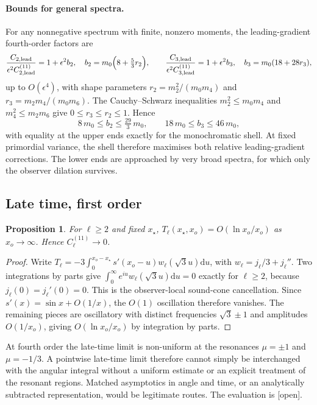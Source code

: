 \documentclass[11pt]{article}
\newtheorem{proposition}[theorem]{Proposition}
\theoremstyle{definition}
\theoremstyle{remark}
\newcommand{\eps}{\epsilon}
\newcommand{\dd}{\mathrm{d}}
\newcommand{\st}[1]{\textsf{[#1]}}
\begin{document}
\paragraph{Bounds for general spectra.} For any nonnegative spectrum with finite, nonzero
moments, the leading-gradient fourth-order factors are
\[
\frac{C_{2,\rm lead}}{\eps^2C^{(11)}_{2,\rm lead}}=1+\eps^2b_2,\quad b_2=m_0\Big(8+\tfrac53r_2\Big),\qquad
\frac{C_{3,\rm lead}}{\eps^2C^{(11)}_{3,\rm lead}}=1+\eps^2b_3,\quad b_3=m_0(18+28r_3),
\]
up to $O(\eps^4)$, with shape parameters $r_2=m_2^2/(m_0m_4)$ and $r_3=m_2m_4/(m_0m_6)$. The
Cauchy--Schwarz inequalities $m_2^2\le m_0m_4$ and $m_4^2\le m_2m_6$ give $0\le r_3\le r_2\le1$.
Hence
\begin{equation}\label{eq:moment-bounds}
\boxed{8\,m_0\le b_2\le\tfrac{29}3\,m_0,\qquad18\,m_0\le b_3\le46\,m_0,}
\end{equation}
with equality at the upper ends exactly for the monochromatic shell. At fixed primordial
variance, the shell therefore maximises both relative leading-gradient corrections. The lower
ends are approached by very broad spectra, for which only the observer dilation survives.


\subsection{Late time, first order}

\begin{proposition}
For $\ell\ge2$ and fixed $x_\star$, $T_\ell(x_\star,x_o)=O(\ln x_o/x_o)$ as $x_o\to\infty$. Hence
$C^{(11)}_\ell\to0$.
\end{proposition}
\begin{proof}
Write $T_\ell=-3\int_0^{x_o-x_\star}s'(x_o-u)w_\ell(\sqrt3u)\dd u$, with $w_\ell=j_\ell/3+j_\ell''$.
Two integrations by parts give $\int_0^\infty e^{iu}w_\ell(\sqrt3u)\dd u=0$ exactly for
$\ell\ge2$, because $j_\ell(0)=j_\ell'(0)=0$. This is the observer-local sound-cone
cancellation. Since $s'(x)=\sin x+O(1/x)$, the $O(1)$ oscillation therefore vanishes. The
remaining pieces are oscillatory with distinct frequencies $\sqrt3\pm1$ and amplitudes
$O(1/x_o)$, giving $O(\ln x_o/x_o)$ by integration by parts.
\end{proof}

At fourth order the late-time limit is non-uniform at the resonances $\mu=\pm1$ and
$\mu=-1/3$. A pointwise late-time limit therefore cannot simply be interchanged with the
angular integral without a uniform estimate or an explicit treatment of the resonant regions.
Matched asymptotics in angle and time, or an analytically subtracted representation, would be
legitimate routes. The evaluation is \st{open}.
\end{document}
